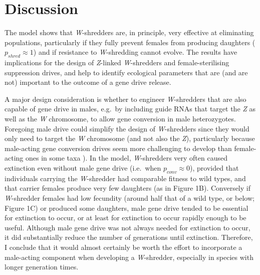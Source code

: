 \documentclass[]{rsos}%
\begin{document}
\hypertarget{discussion}{%
\section{Discussion}\label{discussion}}

The model shows that \emph{W}-shredders are, in principle, very
effective at eliminating populations, particularly if they fully prevent
females from producing daughters (\(p_{shred} \approx 1\)) and if
resistance to \emph{W}-shredding cannot evolve. The results have
implications for the design of \emph{Z}-linked \emph{W}-shredders and
female-sterilising suppression drives, and help to identify ecological
parameters that are (and are not) important to the outcome of a gene
drive release.

A major design consideration is whether to engineer \emph{W}-shredders
that are also capable of gene drive in males, e.g.~by including guide
RNAs that target the \emph{Z} as well as the \emph{W} chromosome, to
allow gene conversion in male heterozygotes. Foregoing male drive could
simplify the design of \emph{W}-shredders since they would only need to
target the \emph{W} chromosome (and not also the \emph{Z}), particularly
because male-acting gene conversion drives seem more challenging to
develop than female-acting ones in some taxa \citep[due to sex
differences in DNA repair;][]{grunwald2019super}). In the model,
\emph{W}-shredders very often caused extinction even without male gene
drive (i.e.~when \(p_{conv} \approx 0\)), provided that individuals
carrying the \emph{W}-shredder had comparable fitness to wild types, and
that carrier females produce very few daughters (as in Figure 1B).
Conversely if \emph{W}-shredder females had low fecundity (around half
that of a wild type, or below; Figure 1C) or produced some daughters,
male gene drive tended to be essential for extinction to occur, or at
least for extinction to occur rapidly enough to be useful. Although male
gene drive was not always needed for extinction to occur, it did
substantially reduce the number of generations until extinction.
Therefore, I conclude that it would almost certainly be worth the effort
to incorporate a male-acting component when developing a
\emph{W}-shredder, especially in species with longer generation times.
\end{document}
